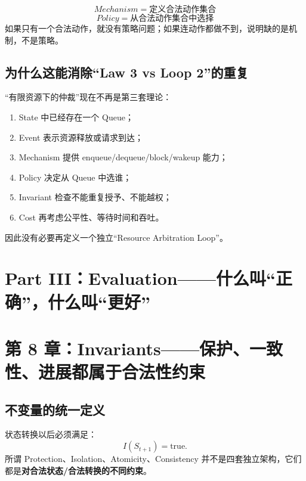 \documentclass[11pt,a4paper]{ctexart}
\newcommand{\kw}[1]{\textbf{#1}}
\begin{document}
\begin{corebox}
\[
\boxed{Mechanism=\text{定义合法动作集合}}
\]
\[
\boxed{Policy=\text{从合法动作集合中选择}}
\]
如果只有一个合法动作，就没有策略问题；如果连动作都做不到，说明缺的是机制，不是策略。
\end{corebox}

\subsection{为什么这能消除“Law 3 vs Loop 2”的重复}
“有限资源下的仲裁”现在不再是第三套理论：
\begin{enumerate}
  \item State 中已经存在一个 Queue；
  \item Event 表示资源释放或请求到达；
  \item Mechanism 提供 enqueue/dequeue/block/wakeup 能力；
  \item Policy 决定从 Queue 中选谁；
  \item Invariant 检查不能重复授予、不能越权；
  \item Cost 再考虑公平性、等待时间和吞吐。
\end{enumerate}
因此没有必要再定义一个独立“Resource Arbitration Loop”。

\newpage
\section{Part III：Evaluation——什么叫“正确”，什么叫“更好”}

\section{第 8 章：Invariants——保护、一致性、进展都属于合法性约束}

\subsection{不变量的统一定义}
状态转换以后必须满足：
\[
\boxed{I(S_{t+1})=\text{true}}.
\]
所谓 Protection、Isolation、Atomicity、Consistency 并不是四套独立架构，它们都是\kw{对合法状态/合法转换的不同约束}。
\end{document}
